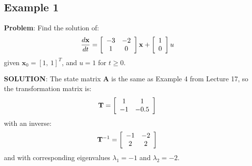  
\subsection*{Example 1}

\textbf{Problem}: Find the solution of:
\[
\frac{{d{\bf{x}}}}{{dt}} = \left[ {\begin{array}{*{20}c}
   { - 3} & { - 2}  \\
   1 & 0  \\
\end{array}} \right]{\bf{x}} + \left[ {\begin{array}{*{20}c}
   1  \\
   0  \\
\end{array}} \right]u
\]
given $\mathbf{x}_0=[1,\ 1]^T$, and $u = 1$ for $t\ge 0$.

\textbf{SOLUTION}: The state matrix $\mathbf{A}$ is the same as Example 4 from Lecture 17, so the transformation matrix is:
\[
{\bf{T}} = \left[ {\begin{array}{*{20}c}
   1 & 1  \\
   { - 1} & { - 0.5}  \\
\end{array}} \right]
\]
with an inverse:
\[
{\bf{T}}^{ - 1}  = \left[ {\begin{array}{*{20}c}
   { - 1} & { - 2}  \\
   2 & 2  \\
\end{array}} \right]
\]
and with corresponding eigenvalues $\lambda_1=-1$ and $\lambda_2=-2$.
 
